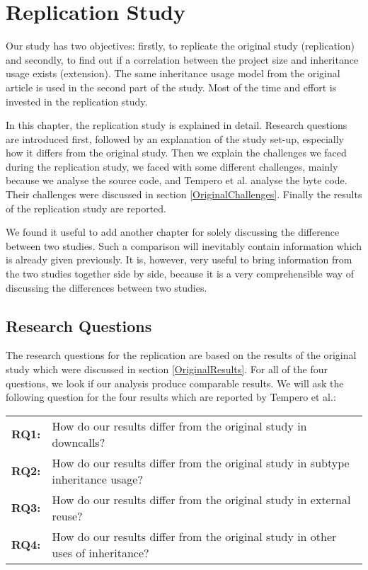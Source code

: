 \documentclass{uvamscse}
\begin{document}
\chapter{Replication Study}
Our study has two objectives: firstly, to replicate the original study (replication) and secondly, to find out if a correlation between the project size and inheritance usage exists (extension). The same inheritance usage model from the original article is used in the second part of the study. Most of the time and effort is invested in the replication study. 

In this chapter, the replication study is explained in detail. Research questions are introduced first, followed by an explanation of the study set-up, especially how it differs from the original study. Then we explain the challenges we faced during the replication study, we faced with some different challenges, mainly because we analyse the source code, and Tempero et al. analyse the byte code. Their challenges were discussed in section \ref{OriginalChallenges}. Finally the results of the replication study are reported.

We found it useful to add another chapter for solely discussing the difference between two studies. Such a comparison will inevitably contain information which is already given previously. It is, however, very useful to bring information from the two studies together side by side, because it is a very comprehensible way of discussing the differences between two studies.




\section{Research Questions}
The research questions for the replication are based on the results of the original study which were discussed in section \ref{OriginalResults}. For all of the four questions, we look if our analysis produce comparable results. We will ask the following question for the four results which are reported by Tempero et al.:

\begin{flushleft}
\begin{tabular}[t]{ p{20mm} p{110mm} }
  \bf{RQ1:} &  How do our results differ from the original study in downcalls? \\
  \bf{RQ2:} &  How do our results differ from the original study in subtype inheritance usage? \\
  \bf{RQ3:} &  How do our results differ from the original study in external reuse? \\
  \bf{RQ4:} &  How do our results differ from the original study in other uses of inheritance?\\
\end{tabular}
\end{flushleft}
\end{document}

